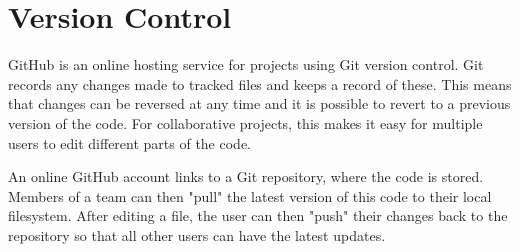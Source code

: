 
\section{Version Control}

GitHub is an online hosting service for projects using Git version control. Git records any changes made to tracked files and keeps a record of these. This means that changes can be reversed at any time and it is possible to revert to a previous version of the code. For collaborative projects, this makes it easy for multiple users to edit different parts of the code. 

An online GitHub account links to a Git repository, where the code is stored. Members of a team can then "pull" the latest version of this code to their local filesystem. After editing a file, the user can then "push" their changes back to the repository so that all other users can have the latest updates. 


